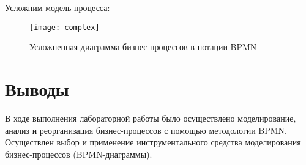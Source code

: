 \documentclass[a4paper,14pt]{extarticle}
\begin{document}
Усложним модель процесса:
\begin{figure}[H]
    \centering
    \texttt{[image: complex]}
    \caption{Усложненная диаграмма бизнес процессов в нотации BPMN}
    \label{fig:complex}
\end{figure}

\section*{Выводы}
В ходе выполнения лабораторной работы было осуществлено моделирование, анализ и
реорганизация бизнес-процессов с помощью методологии BPMN. Осуществлен выбор и
применение инструментального средства моделирования бизнес-процессов
(BPMN-диаграммы).
\end{document}
